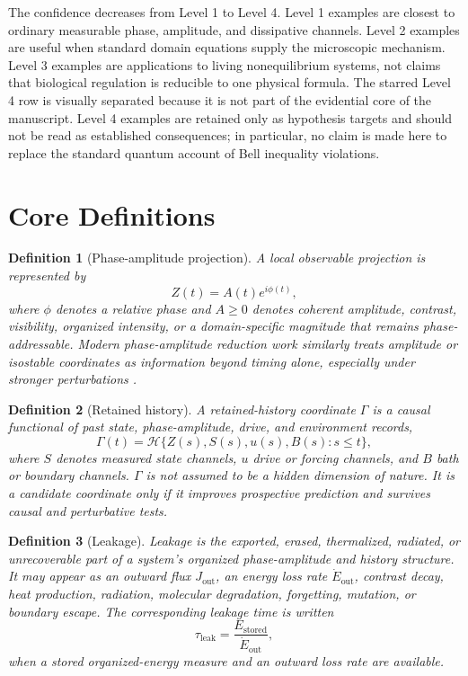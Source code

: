 \documentclass[11pt,a4paper]{article}
\newtheorem{definition}{Definition}
\newcommand{\Ghist}{\Gamma}
\newcommand{\Jout}{J_{\mathrm{out}}}
\newcommand{\taul}{\tau_{\mathrm{leak}}}
\begin{document}
The confidence decreases from Level 1 to Level 4.  Level 1 examples are closest to ordinary measurable phase, amplitude, and dissipative channels.  Level 2 examples are useful when standard domain equations supply the microscopic mechanism.  Level 3 examples are applications to living nonequilibrium systems, not claims that biological regulation is reducible to one physical formula.  The starred Level 4 row is visually separated because it is not part of the evidential core of the manuscript.  Level 4 examples are retained only as hypothesis targets and should not be read as established consequences; in particular, no claim is made here to replace the standard quantum account of Bell inequality violations.

\section{Core Definitions}

\begin{definition}[Phase-amplitude projection]
A local observable projection is represented by
\begin{equation}
  Z(t)=A(t)e^{i\phi(t)},
  \label{eq:phase-amplitude}
\end{equation}
where \(\phi\) denotes a relative phase and \(A\geq0\) denotes coherent amplitude, contrast, visibility, organized intensity, or a domain-specific magnitude that remains phase-addressable.
Modern phase-amplitude reduction work similarly treats amplitude or isostable coordinates as information beyond timing alone, especially under stronger perturbations \cite{KreiderThomas2024}.
\end{definition}

\begin{definition}[Retained history]
A retained-history coordinate \(\Ghist\) is a causal functional of past state, phase-amplitude, drive, and environment records,
\begin{equation}
  \Ghist(t)=\mathcal{H}\{Z(s),S(s),u(s),B(s):s\leq t\},
  \label{eq:gamma-causal}
\end{equation}
where \(S\) denotes measured state channels, \(u\) drive or forcing channels, and \(B\) bath or boundary channels.  \(\Ghist\) is not assumed to be a hidden dimension of nature.  It is a candidate coordinate only if it improves prospective prediction and survives causal and perturbative tests.
\end{definition}

\begin{definition}[Leakage]
Leakage is the exported, erased, thermalized, radiated, or unrecoverable part of a system's organized phase-amplitude and history structure.  It may appear as an outward flux \(\Jout\), an energy loss rate \(\dot E_{\mathrm{out}}\), contrast decay, heat production, radiation, molecular degradation, forgetting, mutation, or boundary escape.  The corresponding leakage time is written
\begin{equation}
  \taul=\frac{E_{\mathrm{stored}}}{\dot E_{\mathrm{out}}},
  \label{eq:leakage-time}
\end{equation}
when a stored organized-energy measure and an outward loss rate are available.
\end{definition}
\end{document}
